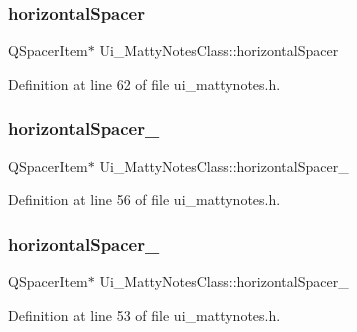 \subsubsection{\texorpdfstring{horizontal\+Spacer}{horizontalSpacer}}
{\footnotesize\ttfamily Q\+Spacer\+Item$\ast$ Ui\+\_\+\+Matty\+Notes\+Class\+::horizontal\+Spacer}



Definition at line 62 of file ui\+\_\+mattynotes.\+h.

\hypertarget{classUi__MattyNotesClass_a5d039495d4d89675b39f564a77484c6e}{}\label{classUi__MattyNotesClass_a5d039495d4d89675b39f564a77484c6e} 
\subsubsection{\texorpdfstring{horizontal\+Spacer\+\_}{horizontalSpacer\_2}}
{\footnotesize\ttfamily Q\+Spacer\+Item$\ast$ Ui\+\_\+\+Matty\+Notes\+Class\+::horizontal\+Spacer\+\_}



Definition at line 56 of file ui\+\_\+mattynotes.\+h.

\hypertarget{classUi__MattyNotesClass_ae061dfb9d8a6a4af88b1d97c4c9a50e6}{}\label{classUi__MattyNotesClass_ae061dfb9d8a6a4af88b1d97c4c9a50e6} 
\subsubsection{\texorpdfstring{horizontal\+Spacer\+\_}{horizontalSpacer\_7}}
{\footnotesize\ttfamily Q\+Spacer\+Item$\ast$ Ui\+\_\+\+Matty\+Notes\+Class\+::horizontal\+Spacer\+\_}



Definition at line 53 of file ui\+\_\+mattynotes.\+h.

\hypertarget{classUi__MattyNotesClass_a715fcf11e482f09362cd1403a60ad8cb}{}\label{classUi__MattyNotesClass_a715fcf11e482f09362cd1403a60ad8cb} 
